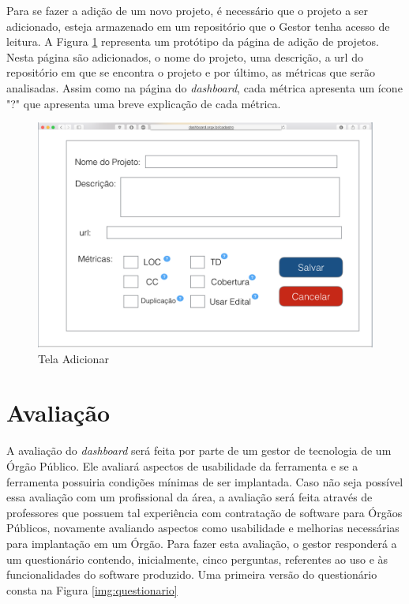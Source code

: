 Para se fazer a adição de um novo projeto, é necessário que o projeto a ser adicionado, esteja armazenado em um repositório que o Gestor tenha acesso de leitura. A Figura \ref{img:telaAdicionar} representa um protótipo da página de adição de projetos. Nesta página são adicionados, o nome do projeto, uma descrição, a url do repositório em que se encontra o projeto e por último, as métricas que serão analisadas. Assim como na página do \textit{dashboard}, cada métrica apresenta um ícone "?" que apresenta uma breve explicação de cada métrica.

\graphicspath{{figuras/}}
\begin{figure}
\centering
\includegraphics[scale=0.60]{telaAdicionar.png}
\caption{Tela Adicionar}
\label{img:telaAdicionar}
\end{figure} 


\section{Avaliação}
A avaliação do \textit{dashboard} será feita por parte de um gestor de tecnologia de um Órgão Público. Ele avaliará aspectos de usabilidade da ferramenta e se a ferramenta possuiria condições mínimas de ser implantada. Caso não seja possível essa avaliação com um profissional da área, a avaliação será feita através de professores que possuem tal experiência com contratação de software para Órgãos Públicos, novamente avaliando aspectos como usabilidade e melhorias necessárias para implantação em um Órgão.
Para fazer esta avaliação, o gestor responderá a um questionário contendo, inicialmente, cinco perguntas, referentes ao uso e às funcionalidades do software produzido. Uma primeira versão do questionário consta na Figura \ref{img:questionario}

